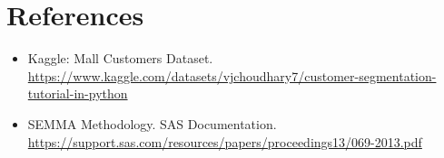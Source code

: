 \documentclass[12pt]{article}
\begin{document}
\section{References}
\begin{itemize}
    \item Kaggle: Mall Customers Dataset. \url{https://www.kaggle.com/datasets/vjchoudhary7/customer-segmentation-tutorial-in-python}
    \item SEMMA Methodology. SAS Documentation. \url{https://support.sas.com/resources/papers/proceedings13/069-2013.pdf}
\end{itemize}
\end{document}
